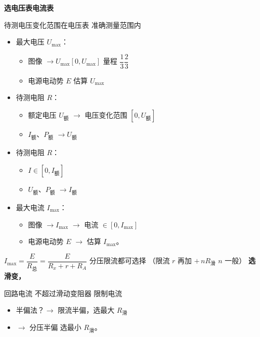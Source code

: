 \textbf{选电压表\quad 电流表}

待测电压变化范围在电压表 准确测量范围内

\begin{itemize}
\item 最大电压 $U_{\max}$：
  \begin{itemize}
  \item 图像 $\to U_{\max}[0,U_{\max}]$ \qquad 量程 $\dfrac{1}{3}$\unclear{$\sim$}$\dfrac{2}{3}$
  \item 电源电动势 $E$ 估算 $U_{\max}$
  \end{itemize}
\item 待测电阻 $R$：
  \begin{itemize}
  \item 额定电压 $U_{\text{额}}$ $\to$ 电压变化范围 $[0,U_{\text{额}}]$
  \item $I_{\text{额}}$、$P_{\text{额}}$ $\to U_{\text{额}}$
  \end{itemize}
\item 待测电阻 $R$：
  \begin{itemize}
  \item $I\in[0,I_{\text{额}}]$
  \item $U_{\text{额}}$、$P_{\text{额}}$ $\to I_{\text{额}}$
  \end{itemize}
\item 最大电流 $I_{\max}$：
  \begin{itemize}
  \item 图像 $\to I_{\max}$ $\to$ 电流 $\in[0,I_{\max}]$
  \item 电源电动势 $E$ $\to$ 估算 $I_{\max}$。
  \end{itemize}
\end{itemize}

$I_{\max}=\dfrac{E}{R_{\text{总}}}=\dfrac{E}{R_x+r+R_A}$ \quad 分压限流都可选择 \quad （限流 $r$ 再加 $+\,nR_{\text{滑}}$ \quad $n$ 一般）
\textbf{选滑变，}

回路电流 不超过滑动变阻器 限制电流

\begin{itemize}
\item 半偏法？$\to$ 限流半偏，选最大 $R_{\text{滑}}$
\item $\to$ 分压半偏 选最小 $R_{\text{滑}}$。
\end{itemize}

